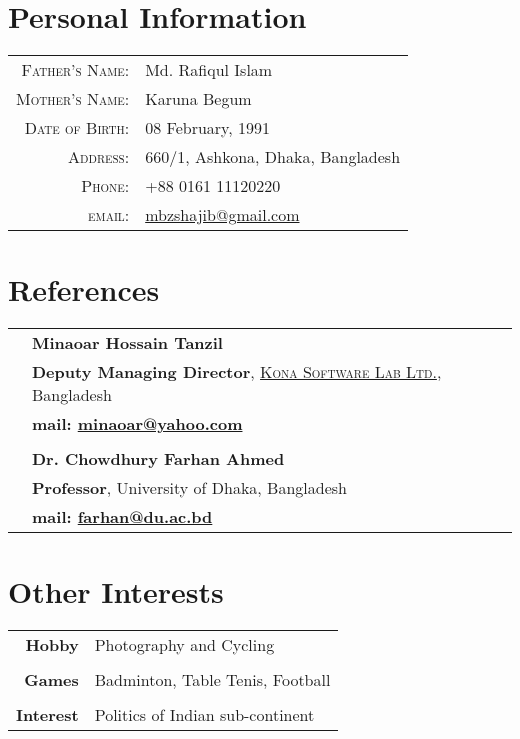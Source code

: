 \documentclass[a4paper,10pt]{article}
\newcommand{\du}{University of Dhaka}
\newcommand{\bd}{Bangladesh}
\newcommand{\kslwithlink}{\textsc{\href{www.konasl.com}{Kona Software Lab Ltd.}}}
\begin{document}
\section*{Personal Information}

\begin{tabular}{r|l}
    \textsc{Father's Name:} & Md. Rafiqul Islam \\
    \textsc{Mother's Name:} & Karuna Begum \\    
    \textsc{Date of Birth:} & 08 February, 1991 \\
    \textsc{Address:}   & 660/1, Ashkona, Dhaka, Bangladesh \\
    \textsc{Phone:}     & +88 0161 11120220\\
    \textsc{email:}     & \href{mailto:mbzshajib@gmail.com}{mbzshajib@gmail.com}  
    
\end{tabular}

\section*{References}
\begin{tabular}{r|l}
	&\textbf{Minaoar Hossain Tanzil}\\
			&\textbf{Deputy Managing Director}, \kslwithlink , \bd\\
			&\bf{mail:} \href{mailto:minaoar@yahoo.com}{minaoar@yahoo.com}\\\\					

	&\textbf{Dr. Chowdhury Farhan Ahmed} \\
			&\textbf{Professor}, \du , \bd\\
			&\bf{mail:} \href{mailto:farhan@du.ac.bd}{farhan@du.ac.bd}\\			


\end{tabular}

\section*{Other Interests}
\begin{tabular}{r|l}
\textbf{Hobby}							&Photography and Cycling\\\\
\textbf{Games}							&Badminton, Table Tenis, Football\\\\
\textbf{Interest}						&Politics of Indian sub-continent\\
								
    
\end{tabular}
\end{document}
